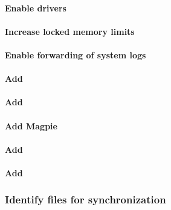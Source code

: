 \documentclass[letterpaper]{article}
\begin{document}
\paragraph{Enable \OmniPath{} drivers}


\vspace*{0.28cm}
\paragraph{Increase locked memory limits}


\paragraph{Enable forwarding of system logs} \label{sec:add_syslog}


\paragraph{Add \clustershell{}}


\paragraph{Add \genders{}}


\paragraph{Add Magpie}


\paragraph{Add \conman{}} \label{sec:add_conman}


\paragraph{Add \nhc{}} \label{sec:add_nhc}


\subsubsection{Identify files for synchronization} \label{sec:file_import}




\vspace*{0.9cm}
\end{document}

